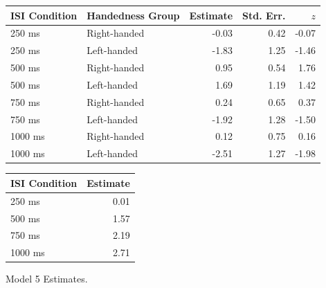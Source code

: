 \documentclass[man,floatsintext]{apa6}
\theoremstyle{definition}
\theoremstyle{definition}
\theoremstyle{definition}
\theoremstyle{remark}
\begin{document}
\begin{appendix}
\begin{table}[!p]
\begin{subtable}{\textwidth}
\begin{table}[H]
\begin{tabular}{llrrr}
\toprule
ISI Condition & Handedness Group & Estimate & Std. Err. & $z$\\
\midrule
250  ms & Right-handed & -0.03 & 0.42 & -0.07\\
250  ms & Left-handed & -1.83 & 1.25 & -1.46\\
500  ms & Right-handed & 0.95 & 0.54 & 1.76\\
500  ms & Left-handed & 1.69 & 1.19 & 1.42\\
750  ms & Right-handed & 0.24 & 0.65 & 0.37\\
750  ms & Left-handed & -1.92 & 1.28 & -1.50\\
1000 ms & Right-handed & 0.12 & 0.75 & 0.16\\
1000 ms & Left-handed & -2.51 & 1.27 & -1.98\\
\bottomrule
\end{tabular}\endgroup{}
\end{table}
\end{subtable}
\begin{subtable}{\textwidth}
\caption{Variance Component Estimates. Estimates are presented on the standard deviation scale. 12\% of the variance is estimated to be at the lab-level and 88\% at the group-level.}
\centering
\begin{table}[H]\centering\begingroup\fontsize{10}{12}\selectfont

\begin{tabular}{lr}
\toprule
ISI Condition & Estimate\\
\midrule
250 ms & 0.01\\
500 ms & 1.57\\
750 ms & 2.19\\
1000 ms & 2.71\\
\bottomrule
\end{tabular}\endgroup{}
\end{table}
\end{subtable}
\end{table}

\begin{table}[!p]
\caption{\label{tab:mod5}Model 5 Estimates.}
\begin{subtable}{\textwidth}
\centering
\begin{table}[H]\centering\begingroup\fontsize{10}{12}\selectfont


\end{table}
\end{subtable}
\end{table}
\end{appendix}
\end{document}
